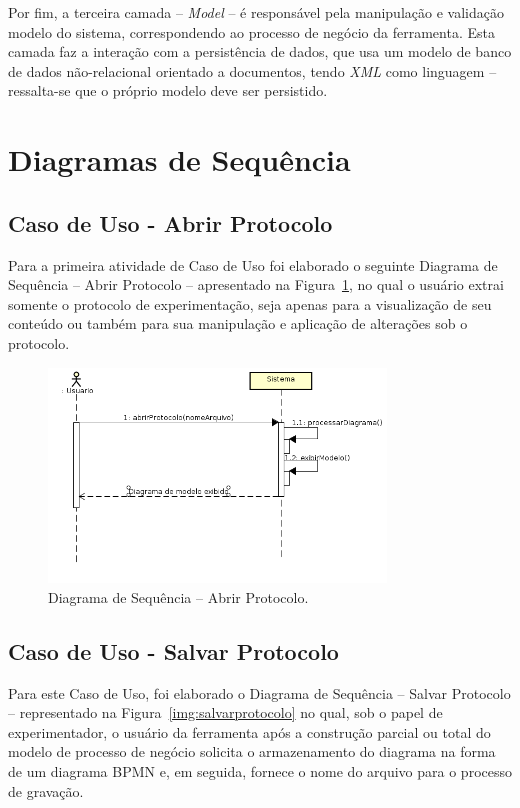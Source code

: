 Por fim, a terceira camada -- \textit{Model} -- é responsável pela manipulação e validação modelo do sistema, correspondendo ao processo de negócio da ferramenta. Esta camada faz a interação com a persistência de dados, que usa um modelo de banco de dados não-relacional orientado a documentos, tendo \textit{XML} como linguagem -- ressalta-se que o próprio modelo deve ser persistido.

\section{Diagramas de Sequência}
\label{sect:sequencia}


\subsection{Caso de Uso - Abrir Protocolo}

Para a primeira atividade de Caso de Uso foi elaborado o seguinte Diagrama de Sequência -- Abrir Protocolo -- apresentado na Figura~\ref{img:abrirprotocolo}, no qual o usuário extrai somente o protocolo de experimentação, seja apenas para a visualização de seu conteúdo ou também para sua manipulação e aplicação de alterações sob o protocolo.

\begin{figure}[!htb]
\centering
\includegraphics[width=0.8\textwidth]{images/abrirprotocolo.png}
\caption{Diagrama de Sequência -- Abrir Protocolo.}
\label{img:abrirprotocolo}
\end{figure}


\subsection{Caso de Uso - Salvar Protocolo}

Para este Caso de Uso, foi elaborado o Diagrama de Sequência -- Salvar Protocolo -- representado na Figura~\ref{img:salvarprotocolo} no qual, sob o papel de experimentador, o usuário da ferramenta após a construção parcial ou total do modelo de processo de negócio solicita o armazenamento do diagrama na forma de um diagrama BPMN e, em seguida, fornece o nome do arquivo para o processo de gravação.

